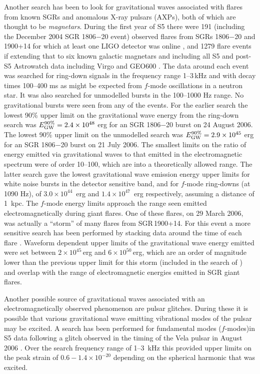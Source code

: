 \documentclass{article}
\begin{document}
Another search has been to look for gravitational waves associated with flares
from known SGRs and anomalous X-ray pulsars (AXPs), both of which are thought to
be {\it magnetars}. During the first year of S5 there were 191 (including the
December 2004 SGR 1806$-$20 event) observed flares from SGRs 1806$-$20 and
1900+14 for which at least one LIGO detector was online \cite{Abbott:2008h}, and
1279 flare events if extending that to six known galactic magnetars and
including all S5 and post-S5 Astrowatch data including Virgo and GEO600
\cite{Abadie:2010c}. The data around each event was searched for ring-down
signals in the frequency range 1--3\,kHz and with decay times 100--400 ms as
might be expected from $f$-mode oscillations in a neutron star. It was also
searched for unmodelled bursts in the 100--1000 Hz range. No gravitational
bursts were seen from any of the events. For the earlier search
\cite{Abbott:2008h} the lowest 90\% upper limit on the gravitational wave energy
from the ring-down search was $E_{\rm GW}^{90\%} = 2.4\times10^{48}$ erg for an
SGR 1806$-$20 burst on 24 August 2006. The lowest 90\% upper limit on the
unmodelled search was $E_{\rm GW}^{90\%} = 2.9\times10^{45}$ erg for an SGR
1806$-$20 burst on 21 July 2006. The smallest limits on the ratio of energy
emitted via gravitational waves to that emitted in the electromagnetic spectrum
were of order 10--100, which are into a theoretically allowed range. The latter
search \cite{Abadie:2010c} gave the lowest gravitational wave emission energy
upper limits for white noise bursts in the detector sensitive band, and for
$f$-mode ring-downs (at 1090 Hz), of $3.0\times10^{44}$~erg and
$1.4\times10^{47}$~erg respectively, assuming a distance of 1~kpc. The $f$-mode
energy limits approach the range seen emitted electromagnetically during giant
flares. One of these flares, on 29 March 2006, was actually a ``storm'' of many
flares from SGR\,1900+14. For this event a more sensitive search has been
performed by stacking data around the time of each flare \cite{Abbott:2009c}.
Waveform dependent upper limits of the gravitational wave energy emitted were
set between $2\times10^{45}$\,erg and $6\times10^{50}$\,erg, which are an order
of magnitude lower than the previous upper limit for this storm (included in the
search of \cite{Abbott:2008h}) and overlap with the range of electromagnetic
energies emitted in SGR giant flares.

Another possible source of gravitational waves associated with an
electromagnetically observed phenomenon are pulsar glitches. During these it is
possible that various gravitational wave emitting vibrational modes of the
pulsar may be excited. A search has been performed for fundamental modes
($f$-modes)in S5 data following a glitch observed in the timing of the Vela
pulsar in August 2006  \cite{Abadie:2010a}. Over the search frequency range
of 1--3~kHz this provided upper limits on the peak strain of
$0.6-1.4\times10^{-20}$ depending on the spherical harmonic that was excited.
\end{document}
